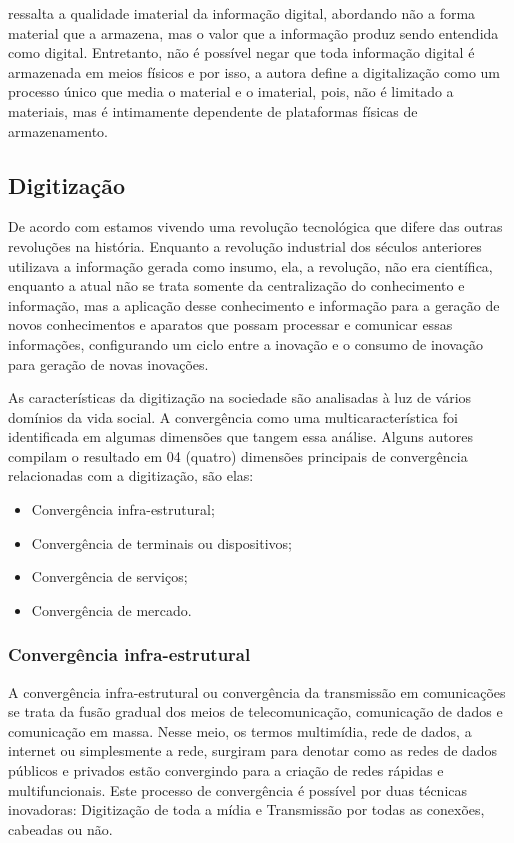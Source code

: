 \cite[p.~312]{manoff2006} ressalta a qualidade imaterial da informação digital, abordando não a forma material que a armazena, mas o valor que a informação produz sendo entendida como digital. Entretanto, não é possível negar que toda informação digital é armazenada em meios físicos e por isso, a autora define a digitalização como um processo único que media o material e o imaterial, pois, não é limitado a materiais, mas é intimamente dependente de plataformas físicas de armazenamento.

\subsection{Digitização}

De acordo com \cite{castells2010} estamos vivendo uma revolução tecnológica que difere das outras revoluções na história. Enquanto a revolução industrial dos séculos anteriores utilizava a informação gerada como insumo, ela, a revolução, não era científica, enquanto a atual não se trata somente da centralização do conhecimento e informação, mas a aplicação desse conhecimento e informação para a geração de novos conhecimentos e aparatos que possam processar e comunicar essas informações, configurando um ciclo entre a inovação e o consumo de inovação para geração de novas inovações.

As características da digitização na sociedade são analisadas à luz de vários domínios da vida social. A convergência como uma multicaracterística foi identificada em algumas dimensões que tangem essa análise. Alguns autores compilam o resultado em 04 (quatro) dimensões principais de convergência relacionadas com a digitização, são elas:
\begin{itemize}
	\item{Convergência infra-estrutural;}
	\item{Convergência de terminais ou dispositivos;}
	\item{Convergência de serviços;}
	\item{Convergência de mercado.}
\end{itemize}

\subsubsection{Convergência infra-estrutural}
A convergência infra-estrutural ou convergência da transmissão em comunicações \cite{vandijk2006} se trata da fusão gradual dos meios de telecomunicação, comunicação de dados e comunicação em massa. Nesse meio, os termos multimídia, rede de dados, a internet ou simplesmente a rede, surgiram para denotar como as redes de dados públicos e privados estão convergindo para a criação de redes rápidas e multifuncionais. Este processo de convergência é possível por duas técnicas inovadoras: Digitização de toda a mídia e Transmissão por todas as conexões, cabeadas ou não.

